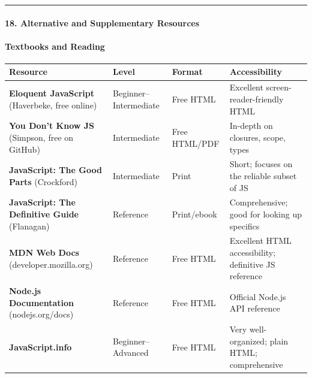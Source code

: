 \documentclass[
  justified,
  openright,
]{tufte-book}
\let\subsection\paragraph
\let\paragraph\paragraph
\let\subsection\paragraph
\let\paragraph\paragraph
\begin{document}
\begin{center}\rule{0.5\linewidth}{0.5pt}\end{center}

\subsection{18. Alternative and Supplementary
Resources}\label{alternative-and-supplementary-resources-1}

\subsection{Textbooks and Reading}\label{textbooks-and-reading-1}

\begin{fullwidth}{\def\LTcaptype{none} %
\begin{longtable}[]{@{}
  >{\raggedright\arraybackslash}p{}
  >{\raggedright\arraybackslash}p{}
  >{\raggedright\arraybackslash}p{}
  >{\raggedright\arraybackslash}p{}@{}}
\toprule\noalign{}
\begin{minipage}[b]{\linewidth}\raggedright
Resource
\end{minipage} & \begin{minipage}[b]{\linewidth}\raggedright
Level
\end{minipage} & \begin{minipage}[b]{\linewidth}\raggedright
Format
\end{minipage} & \begin{minipage}[b]{\linewidth}\raggedright
Accessibility
\end{minipage} \\
\midrule\noalign{}
\endhead
\bottomrule\noalign{}
\endlastfoot
\textbf{Eloquent JavaScript} (Haverbeke, free online) &
Beginner--Intermediate & Free HTML & Excellent screen-reader-friendly
HTML \\
\textbf{You Don't Know JS} (Simpson, free on GitHub) & Intermediate &
Free HTML/PDF & In-depth on closures, scope, types \\
\textbf{JavaScript: The Good Parts} (Crockford) & Intermediate & Print &
Short; focuses on the reliable subset of JS \\
\textbf{JavaScript: The Definitive Guide} (Flanagan) & Reference &
Print/ebook & Comprehensive; good for looking up specifics \\
\textbf{MDN Web Docs} (developer.mozilla.org) & Reference & Free HTML &
Excellent HTML accessibility; definitive JS reference \\
\textbf{Node.js Documentation} (nodejs.org/docs) & Reference & Free HTML
& Official Node.js API reference \\
\textbf{JavaScript.info} & Beginner--Advanced & Free HTML & Very
well-organized; plain HTML; comprehensive \\
\end{longtable}
}
\end{fullwidth}
\end{document}
